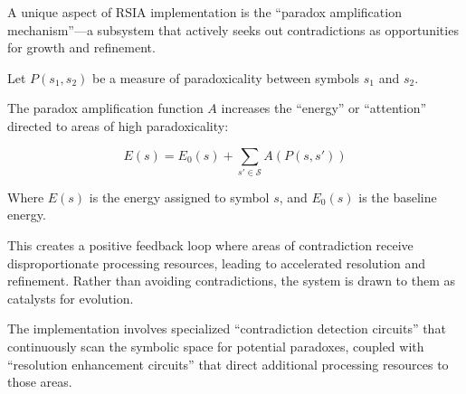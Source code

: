 \documentclass[12pt]{article}
\begin{document}
A unique aspect of RSIA implementation is the ``paradox amplification
mechanism''---a subsystem that actively seeks out contradictions as
opportunities for growth and refinement.

Let \(P(s_1, s_2)\) be a measure of paradoxicality between symbols
\(s_1\) and \(s_2\).

The paradox amplification function \(A\) increases the ``energy'' or
``attention'' directed to areas of high paradoxicality:

\[E(s) = E_0(s) + \sum_{s' \in \mathcal{S}} A(P(s, s'))\]

Where \(E(s)\) is the energy assigned to symbol \(s\), and \(E_0(s)\) is
the baseline energy.

This creates a positive feedback loop where areas of contradiction
receive disproportionate processing resources, leading to accelerated
resolution and refinement. Rather than avoiding contradictions, the
system is drawn to them as catalysts for evolution.

The implementation involves specialized ``contradiction detection
circuits'' that continuously scan the symbolic space for potential
paradoxes, coupled with ``resolution enhancement circuits'' that direct
additional processing resources to those areas.
\end{document}
